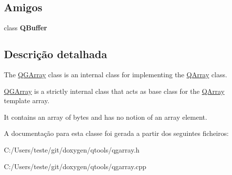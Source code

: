 \subsection*{Amigos}
\begin{DoxyCompactItemize}
\item 
\hypertarget{class_q_g_array_a6e20d98ed3f0cea33e4221e417f1a021}{class {\bfseries Q\-Buffer}}\label{class_q_g_array_a6e20d98ed3f0cea33e4221e417f1a021}

\end{DoxyCompactItemize}


\subsection{Descrição detalhada}
The \hyperlink{class_q_g_array}{Q\-G\-Array} class is an internal class for implementing the \hyperlink{class_q_array}{Q\-Array} class. 

\hyperlink{class_q_g_array}{Q\-G\-Array} is a strictly internal class that acts as base class for the \hyperlink{class_q_array}{Q\-Array} template array.

It contains an array of bytes and has no notion of an array element. 

A documentação para esta classe foi gerada a partir dos seguintes ficheiros\-:\begin{DoxyCompactItemize}
\item 
C\-:/\-Users/teste/git/doxygen/qtools/qgarray.\-h\item 
C\-:/\-Users/teste/git/doxygen/qtools/qgarray.\-cpp\end{DoxyCompactItemize}
